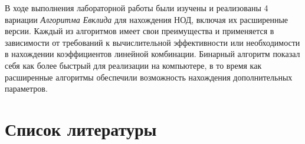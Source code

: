 \documentclass[
]{article}
\begin{document}
В ходе выполнения лабораторной работы были изучены и реализованы 4
вариации \emph{Алгоритма Евклида} для нахождения НОД, включая их
расширенные версии. Каждый из алгоритмов имеет свои преимущества и
применяется в зависимости от требований к вычислительной эффективности
или необходимости в нахождении коэффициентов линейной комбинации.
Бинарный алгоритм показал себя как более быстрый для реализации на
компьютере, в то время как расширенные алгоритмы обеспечили возможность
нахождения дополнительных параметров.

\section{Список
литературы}\label{ux441ux43fux438ux441ux43eux43a-ux43bux438ux442ux435ux440ux430ux442ux443ux440ux44b}
\end{document}
